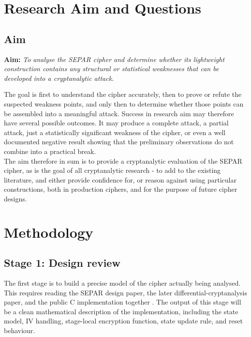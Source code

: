 \documentclass[11pt]{article}
\begin{document}
\section{Research Aim and Questions}

\subsection{Aim}

\textbf{Aim:} \textit{To analyse the SEPAR cipher and determine whether its lightweight construction contains any structural or statistical weaknesses that can be developed into a cryptanalytic attack.}

The goal is first to understand the cipher accurately, then to prove or refute the suspected weakness points, and only then to determine whether those points can be assembled into a meaningful attack. Success in research aim may therefore have several possible outcomes. It may produce a complete attack, a partial attack, just a statistically significant weakness of the cipher, or even a well documented negative result showing that the preliminary observations do not combine into a practical break.\\

The aim therefore in sum is to provide a cryptanalytic evaluation of the SEPAR cipher, as is the goal of all cryptanalytic research - to add to the existing literature, and either provide confidence for, or reason against using particular constructions, both in production ciphers, and for the purpose of future cipher designs.


\section{Methodology}

\subsection{Stage 1: Design review}

The first stage is to build a precise model of the cipher actually being analysed. This requires reading the SEPAR design paper, the later differential-cryptanalysis paper, and the public C implementation together \cite{VahiJassbi2020,VahiMirnia2021}. The output of this stage will be a clean mathematical description of the implementation, including the state model, IV handling, stage-local encryption function, state update rule, and reset behaviour.\\
\end{document}
